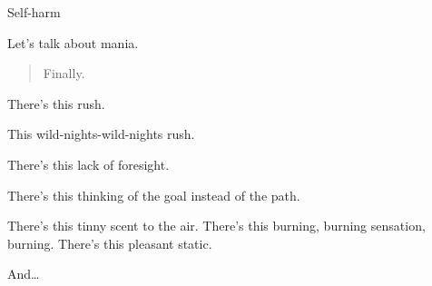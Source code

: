 Self-harm

Let's talk about mania.

\begin{quote}
Finally.
\end{quote}

There's this rush.

This wild-nights-wild-nights rush.

There's this lack of foresight.

There's this thinking of the goal instead of the path.

There's this tinny scent to the air. There's this burning, burning sensation, burning. There's this pleasant static.

And\ldots{}
